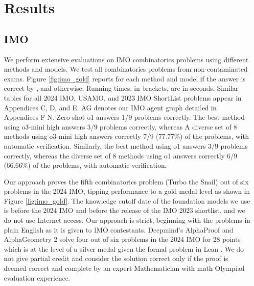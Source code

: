 \section{Results}

\newcommand{\C}{\ding{52} }
\newcommand{\X}{\ding{55} }
\newcommand{\F}{\ding{108} }

\subsection{IMO}

We perform extensive evaluations on IMO combinatorics problems using different methods and models. We test all combinatorics problems from non-contaminated exams. Figure \ref{fig:imo_gold} reports for each method and model if the answer is correct by \C, and \X otherwise. Running times, in brackets, are in seconds. Similar tables for all 2024 IMO, USAMO, and 2023 IMO ShortList problems appear in Appendices C, D, and E. AG denotes our IMO agent graph detailed in Appendices F-N. Zero-shot o1 answers 1/9 problems correctly. The best method using o3-mini high answers 3/9 problems correctly, whereas A diverse set of 8 methods using o3-mini high answers correctly 7/9 (77.77\%) of the problems, with automatic verification. Similarly, the best method using o1 answers 3/9 problems correctly, whereas the diverse set of 8 methods using o1 answers correctly 6/9 (66.66\%) of the problems, with automatic verification.

Our approach proves the fifth combinatorics problem (Turbo the Snail) out of six problems in the 2024 IMO, tipping performance to a gold medal level as shown in Figure \ref{fig:imo_gold}. The knowledge cutoff date of the foundation models we use is before the 2024 IMO and before the release of the IMO 2023 shortlist, and we do not use Internet access. Our approach is strict, beginning with the problems in plain English as it is given to IMO contestants. Deepmind's AlphaProof and AlphaGeometry 2 solve four out of six problems in the 2024 IMO for 28 points which is at the level of a silver medal \cite{deepmind2024natureblog,deepmindsilverblog} given the formal problem in Lean \cite{deepmindsilverlean}. We do not give partial credit and consider the solution correct only if the proof is deemed correct and complete by an expert Mathematician with math Olympiad evaluation experience.

